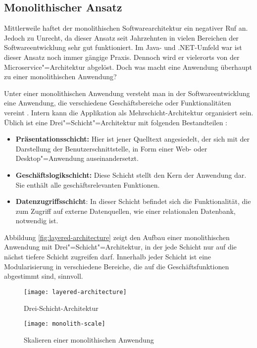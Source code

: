 \subsection{Monolithischer Ansatz}

Mittlerweile haftet der monolithischen Softwarearchitektur ein negativer Ruf an. Jedoch zu Unrecht, da dieser Ansatz seit Jahrzehnten  in vielen Bereichen der Softwareentwicklung sehr gut funktioniert. Im Java- und .NET-Umfeld war \bzw ist dieser Ansatz noch immer gängige Praxis. Dennoch wird er vielerorts von der Microservice"=Architektur abgelöst. Doch was macht eine Anwendung überhaupt zu einer monolithischen Anwendung?

Unter einer monolithischen Anwendung versteht man in der Softwareentwicklung eine Anwendung, die verschiedene Geschäftsbereiche oder Funktionalitäten vereint \cite{FowlerMS}. Intern kann die Applikation \zB als Mehrschicht-Architektur organisiert sein. Üblich ist eine Drei"=Schicht"=Architektur mit folgenden Bestandteilen \cite[19]{FowlerPEA}:

\begin{itemize}
	\item \textbf{Präsentationsschicht:} Hier ist jener Quelltext angesiedelt, der sich mit der Darstellung der Benutzerschnittstelle, \zB in Form einer Web- oder Desktop"=Anwendung auseinandersetzt.
	\item \textbf{Geschäftslogikschicht:} Diese Schicht stellt den Kern der Anwendung dar. Sie enthält alle geschäftsrelevanten Funktionen.
	\item \textbf{Datenzugriffsschicht}: In dieser Schicht befindet sich die Funktionalität, die zum Zugriff auf externe Datenquellen, wie \zB einer relationalen Datenbank, notwendig ist.
\end{itemize}

Abbildung \ref{fig:layered-architecture} zeigt den Aufbau einer monolithischen Anwendung mit Drei"=Schicht"=Architektur, in der jede Schicht nur auf die nächst tiefere Schicht zugreifen darf. Innerhalb jeder Schicht ist eine Modularisierung in verschiedene Bereiche, die auf die Geschäftsfunktionen abgestimmt sind, sinnvoll.

\begin{figure}[!htb]
\centering
{}
  \centering
	\texttt{[image: layered-architecture]}
	\caption{Drei-Schicht-Architektur}
	\label{fig:layered-architecture}
\endminipage
{}
  \centering
	\texttt{[image: monolith-scale]}
	\caption{Skalieren einer monolithischen Anwendung}
	\label{fig:monolith-scale}
\endminipage
\end{figure}

